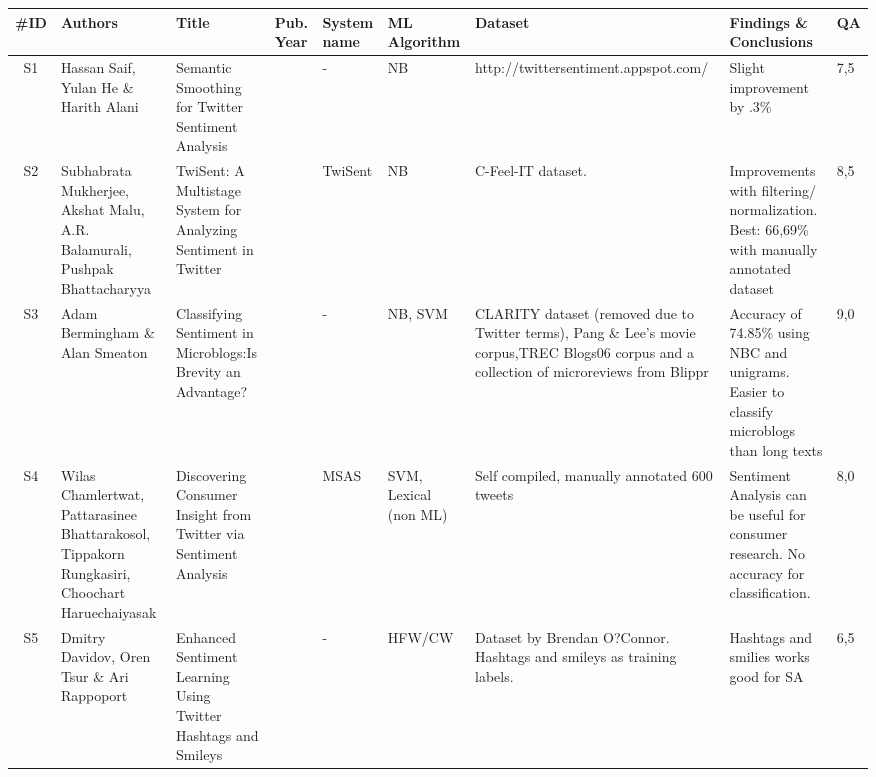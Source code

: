 
\begin{sidewaystable}
    \centering
    \caption{Data extraction step, table 1/4. Showing data as per defined in the SLRP in appendix~\autoref{apx:slrp}}
    \scriptsize
    \label{tab:extraction1}
    \begin{longtable}{|c|p{3cm}|p{4cm}|p{0.6cm}|p{1cm}|p{1.3cm}|p{4cm}|p{3cm}|p{0.3cm}|} 
    
    \hline
    \textbf{\#ID} & \textbf{Authors} & \textbf{Title} & \textbf{Pub. Year} & \textbf{System name} & \textbf{ML Algorithm} & \textbf{Dataset} & \textbf{Findings} \& \textbf{Conclusions} & \textbf{QA} \\ 
    \hline
    
    S1 & Hassan Saif, Yulan He \& Harith Alani & Semantic Smoothing for Twitter Sentiment Analysis & \citeyear{saif2011semantic} & - & NB & http://twittersentiment.appspot.com/ & Slight improvement by .3\% & 7,5 \\ \hline  
    
    S2 & Subhabrata Mukherjee, Akshat Malu, A.R. Balamurali, Pushpak Bhattacharyya & TwiSent: A Multistage System for Analyzing Sentiment in Twitter & \citeyear{mukherjee2012twisent} & TwiSent & NB & C-Feel-IT dataset.  & Improvements with filtering/ normalization. Best: 66,69\% with manually annotated dataset  & 8,5 \\ \hline  
    
    S3 & Adam Bermingham \& Alan Smeaton & Classifying Sentiment in Microblogs:Is Brevity an Advantage? & \citeyear{article:bermingham} & - & NB, SVM & CLARITY dataset (removed due to Twitter terms), Pang \& Lee's movie corpus,TREC Blogs06 corpus and a collection of microreviews from Blippr & Accuracy of 74.85\% using NBC and unigrams. Easier to classify microblogs than long texts  & 9,0 \\ \hline  
    
    S4 & Wilas Chamlertwat, Pattarasinee Bhattarakosol, Tippakorn Rungkasiri, Choochart Haruechaiyasak & Discovering Consumer Insight from Twitter via Sentiment Analysis & \citeyear{chamlertwat2012discovering} & MSAS & SVM, Lexical (non ML) & Self compiled, manually annotated 600 tweets & Sentiment Analysis can be useful for consumer research. No accuracy for classification.  & 8,0 \\ \hline  
    
    S5 & Dmitry Davidov, Oren Tsur \& Ari Rappoport & Enhanced Sentiment Learning Using Twitter Hashtags and Smileys & \citeyear{davidov2010enhanced} & - & HFW/CW & Dataset by Brendan O?Connor. Hashtags and smileys as training labels. & Hashtags and smilies works good for SA  & 6,5 \\ \hline  
    

\end{longtable}
\end{sidewaystable}
